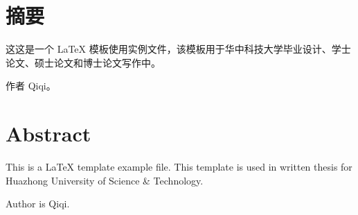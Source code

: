 
\section*{摘要}
这这是一个 \LaTeX{} 模板使用实例文件，该模板用于华中科技大学毕业设计、学士论文、硕士论文和博士论文写作中。

作者 Qiqi。

\clearpage
\section*{Abstract}
This is a \LaTeX{} template example file. This template is used in written thesis for Huazhong University of Science \& Technology.

Author is Qiqi.

\clearpage